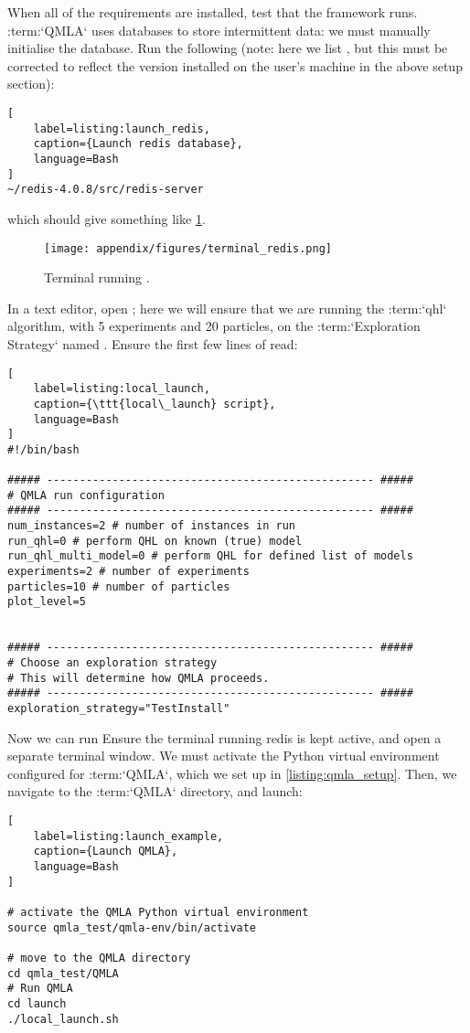 When all of the requirements are installed, test that the framework runs. 
:term:`QMLA` uses  databases to store intermittent data:
    we must manually initialise the database. 
Run the following 
    (note: here we list , but this must be corrected to reflect the 
    version installed on the user's machine in the above setup section):
\begin{lstlisting}[
    label=listing:launch_redis,
    caption={Launch redis database},
    language=Bash
]
~/redis-4.0.8/src/redis-server
\end{lstlisting}

which should give something like \cref{fig:terminal_redis}.
\begin{figure}[h!]
    \begin{center}
        \texttt{[image: appendix/figures/terminal\_redis.png]}
    \end{center}
    \caption[Terminal running redis-server]{Terminal running .}
    \label{fig:terminal_redis}
\end{figure}
\par 

In a text editor, open ; 
    here we will ensure that we are running the :term:`qhl` algorithm, 
    with 5 experiments and 20 particles, on the :term:`Exploration Strategy` named .
Ensure the first few lines of  read:

\begin{lstlisting}[
    label=listing:local_launch,
    caption={\ttt{local\_launch} script},
    language=Bash
]
#!/bin/bash

##### -------------------------------------------------- #####
# QMLA run configuration
##### -------------------------------------------------- #####
num_instances=2 # number of instances in run
run_qhl=0 # perform QHL on known (true) model
run_qhl_multi_model=0 # perform QHL for defined list of models
experiments=2 # number of experiments
particles=10 # number of particles
plot_level=5


##### -------------------------------------------------- #####
# Choose an exploration strategy 
# This will determine how QMLA proceeds. 
##### -------------------------------------------------- #####
exploration_strategy="TestInstall"
\end{lstlisting}    

Now we can run 
Ensure the terminal running redis is kept active, and open a separate terminal window. 
We must activate the Python virtual environment configured for :term:`QMLA`, 
which we set up in \cref{listing:qmla_setup}. 
Then, we navigate to the :term:`QMLA` directory, and launch:
\begin{lstlisting}[
    label=listing:launch_example,
    caption={Launch QMLA},
    language=Bash
]

# activate the QMLA Python virtual environment 
source qmla_test/qmla-env/bin/activate

# move to the QMLA directory 
cd qmla_test/QMLA
# Run QMLA
cd launch   
./local_launch.sh

\end{lstlisting}

